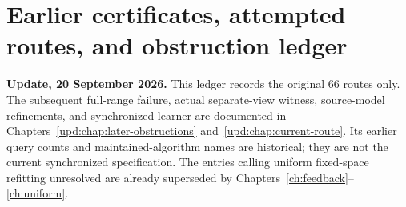 \documentclass[11pt,oneside,openany,a4paper]{book}
\numberwithin{equation}{chapter}
\theoremstyle{definition}
\theoremstyle{remark}
\newcommand{\proofstep}[1]{\par\addvspace{.45\baselineskip}\Needspace{3\baselineskip}\textbf{#1}\par\nobreak}
\newcommand{\R}{\mathbb R}\newcommand{\E}{\mathbb E}\newcommand{\Prb}{\mathbb P}\newcommand{\PP}{\mathbb P}
\newcommand{\T}{\mathsf T}\newcommand{\Id}{I}
\newcommand{\F}[1]{\left\lVert#1\right\rVert_F}
\newcommand{\N}[1]{\left\lVert#1\right\rVert}
\newcommand{\op}[1]{\left\lVert#1\right\rVert_{\rm op}}
\newcommand{\ip}[2]{\left\langle#1,#2\right\rangle_F}
\DeclareMathOperator{\tr}{tr}\DeclareMathOperator{\rank}{rank}
\DeclareMathOperator{\diag}{blockdiag}\DeclareMathOperator{\range}{range}
\DeclareMathOperator{\HSS}{HSS}\DeclareMathOperator{\dist}{dist}
\DeclareMathOperator{\Var}{Var}\DeclareMathOperator{\supp}{supp}
\newcommand{\UC}{\mathcal U}\newcommand{\VC}{\mathcal V}\newcommand{\err}{\mathcal E}
\newcommand{\Sn}[2]{\left\lVert#1\right\rVert_{S_{#2}}}
\newcommand{\Cov}{\mathsf C}\newcommand{\Loss}{\mathsf L}\newcommand{\Fil}{\mathcal F}
\DeclareMathOperator{\diver}{div}\DeclareMathOperator{\vecop}{vec}\DeclareMathOperator{\Gammafun}{Gamma}
\begin{document}
\begingroup
\let\R\relax
\newcommand{\R}{\mathbb R}
\let\E\relax
\newcommand{\E}{\mathbb E}
\let\Prb\relax
\newcommand{\Prb}{\mathbb P}
\let\T\relax
\newcommand{\T}{\mathsf T}
\let\F\relax
\newcommand{\F}[1]{\left\lVert#1\right\rVert_{F}}
\let\N\relax
\newcommand{\N}[1]{\left\lVert#1\right\rVert}
\let\ip\relax
\newcommand{\ip}[2]{\left\langle#1,#2\right\rangle_F}
\let\tr\relax
\newcommand{\tr}{\operatorname{tr}}
\let\rank\relax
\newcommand{\rank}{\operatorname{rank}}
\let\diag\relax
\newcommand{\diag}{\operatorname{blockdiag}}
\let\range\relax
\newcommand{\range}{\operatorname{range}}
\let\OPT\relax
\newcommand{\OPT}{\operatorname{OPT}}
\let\HSS\relax
\newcommand{\HSS}{\operatorname{HSS}}
\let\diver\relax
\newcommand{\diver}{\operatorname{div}}
\let\Var\relax
\newcommand{\Var}{\operatorname{Var}}
\let\UC\relax
\newcommand{\UC}{\mathcal U}
\let\VC\relax
\newcommand{\VC}{\mathcal V}
\let\err\relax
\newcommand{\err}{\mathcal E}
\let\proofstep\relax
\newcommand{\proofstep}[1]{\par\addvspace{.45\baselineskip}\Needspace{3\baselineskip}\textbf{#1}\par\nobreak}
\let\op\relax
\newcommand{\op}[1]{\left\lVert#1\right\rVert_{\mathrm{op}}}
\let\Sn\relax
\newcommand{\Sn}[2]{\left\lVert#1\right\rVert_{S_{#2}}}
\let\Cov\relax
\newcommand{\Cov}{\mathsf C}
\let\Loss\relax
\newcommand{\Loss}{\mathsf L}
\let\Fil\relax
\newcommand{\Fil}{\mathcal F}
\let\Id\relax
\newcommand{\Id}{I}
\let\supp\relax
\newcommand{\supp}{\operatorname{supp}}
\let\vecop\relax
\newcommand{\vecop}{\operatorname{vec}}
\let\Gammafun\relax
\newcommand{\Gammafun}{\operatorname{Gamma}}
\chapter{Earlier certificates, attempted routes, and obstruction ledger}\label{ch:routeledger}
\begin{scopebox}
\textbf{Update, 20 September 2026.} This ledger records the original 66 routes only. The subsequent full-range failure, actual separate-view witness, source-model refinements, and synchronized learner are documented in Chapters~\ref{upd:chap:later-obstructions} and~\ref{upd:chap:current-route}. Its earlier query counts and maintained-algorithm names are historical; they are not the current synchronized specification. The entries calling uniform fixed-space refitting unresolved are already superseded by Chapters~\ref{ch:feedback}--\ref{ch:uniform}.
\end{scopebox}
\end{document}

